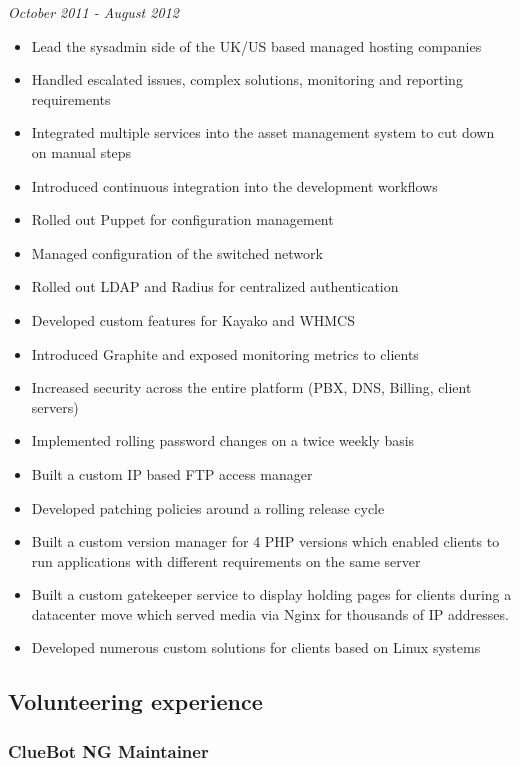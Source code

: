 \emph{October 2011 - August 2012}

\begin{itemize}
\tightlist
\item
  Lead the sysadmin side of the UK/US based managed hosting companies
\item
  Handled escalated issues, complex solutions, monitoring and reporting
  requirements
\item
  Integrated multiple services into the asset management system to cut
  down on manual steps
\item
  Introduced continuous integration into the development workflows
\item
  Rolled out Puppet for configuration management
\item
  Managed configuration of the switched network
\item
  Rolled out LDAP and Radius for centralized authentication
\item
  Developed custom features for Kayako and WHMCS
\item
  Introduced Graphite and exposed monitoring metrics to clients
\item
  Increased security across the entire platform (PBX, DNS, Billing,
  client servers)
\item
  Implemented rolling password changes on a twice weekly basis
\item
  Built a custom IP based FTP access manager
\item
  Developed patching policies around a rolling release cycle
\item
  Built a custom version manager for 4 PHP versions which enabled
  clients to run applications with different requirements on the same
  server
\item
  Built a custom gatekeeper service to display holding pages for clients
  during a datacenter move which served media via Nginx for thousands of
  IP addresses.
\item
  Developed numerous custom solutions for clients based on Linux systems
\end{itemize}

\subsection{Volunteering experience}\label{volunteering-experience}

\subsubsection{ClueBot NG Maintainer}\label{cluebot-ng-maintainer}

